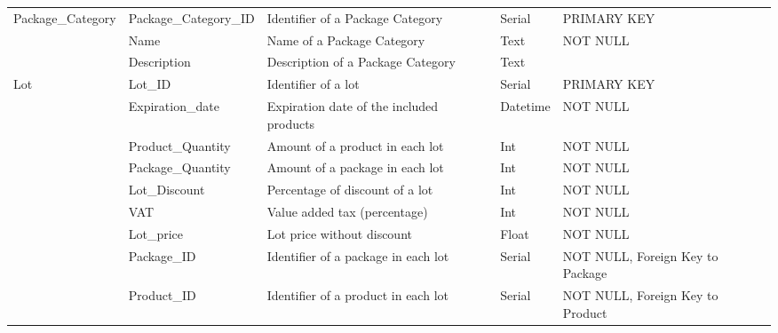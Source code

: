 \begin{longtable}{|p{}|p{} |p{}|p{}|p{} |}
\multirow{3}{*}{Package\_Category} & Package\_Category\_ID & Identifier of a Package Category & Serial & PRIMARY KEY \\\cline{2-5}
& Name & Name of a Package Category & Text & NOT NULL \\\cline{2-5}
& Description & Description of a Package Category & Text & \\\hline

\multirow{8}{*}{Lot} & Lot\_ID & Identifier of a lot & Serial & PRIMARY KEY \\\cline{2-5}
& Expiration\_date & Expiration date of the included products & Datetime & NOT NULL \\\cline{2-5}
& Product\_Quantity & Amount of a product in each lot & Int & NOT NULL \\\cline{2-5}
& Package\_Quantity & Amount of a package in each lot & Int & NOT NULL \\\cline{2-5}
& Lot\_Discount & Percentage of discount of a lot & Int & NOT NULL \\\cline{2-5}
& VAT & Value added tax (percentage) & Int & NOT NULL \\\cline{2-5}
& Lot\_price & Lot price without discount & Float & NOT NULL \\\cline{2-5}
& Package\_ID & Identifier of a package in each lot & Serial & NOT NULL, Foreign Key to Package \\\cline{2-5}
& Product\_ID &  Identifier of a product in each lot & Serial & NOT NULL, Foreign Key to Product \\\hline


\end{longtable}
